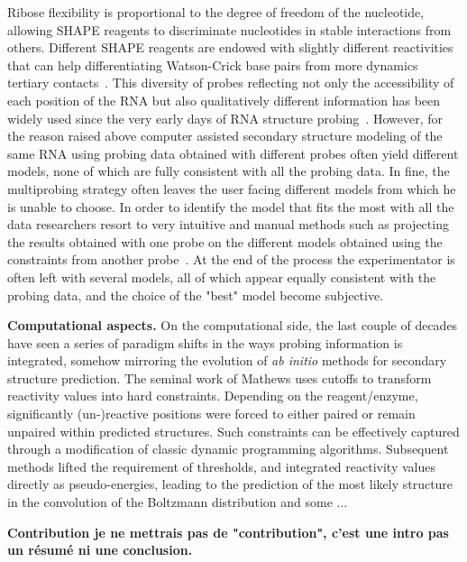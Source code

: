 \documentclass[a4,center,fleqn]{NAR}
\newcommand{\Blabla}[1][5-6]{{\color{blue!40!white}\lipsum*[#1]}}
\begin{document}
Ribose flexibility is proportional to the degree of freedom of the nucleotide, allowing SHAPE reagents to discriminate nucleotides in stable interactions from others. Different SHAPE reagents are endowed with slightly different reactivities that can help differentiating Watson-Crick base pairs from more dynamics tertiary contacts~\cite{Gherghe2008,Steen2012}. This diversity of probes reflecting not only the accessibility of each position of the RNA but also qualitatively different information has been widely used since the very early days of RNA structure probing~\cite{Moazed1986, Romaniuk1988, Butcher1994, Brunel2000,  Cordero2015, Somarowthu2015, Gross2017}. However, for the reason raised above computer assisted secondary structure modeling of the same RNA using probing data obtained with different probes often yield different models, none of which are fully consistent with all the probing data. In fine, the multiprobing strategy often leaves the user facing different models from which he is unable to choose. 
In order to identify the model that fits the most with all the data researchers resort to very intuitive and manual methods such as projecting the results obtained with one probe on the different models obtained using the constraints from another probe~\cite{Herbreteau2005,James2008,Weill2004,Othman2014}. At the end of the process the experimentator is often left with several models, all of which appear equally consistent with the probing data, and the choice of the "best" model become subjective. 


{\noindent\bf Computational aspects.}
On the computational side, the last couple of decades have seen a series of paradigm shifts in the ways probing information is integrated, somehow mirroring the evolution of {\em ab initio} methods for secondary structure prediction. The seminal work of Mathews uses cutoffs to transform reactivity values into hard constraints. Depending on the reagent/enzyme, significantly (un-)reactive positions were forced to either paired or remain unpaired within predicted structures. Such constraints can be effectively captured through a modification of classic dynamic programming algorithms. Subsequent methods lifted the requirement of thresholds, and integrated reactivity values directly as pseudo-energies, leading to the prediction of the most likely structure in the convolution of the Boltzmann distribution and some ...

{\noindent\bf Contribution je ne mettrais pas de "contribution", c'est une intro pas un résumé ni une conclusion.}
\Blabla[7-8]
\end{document}
